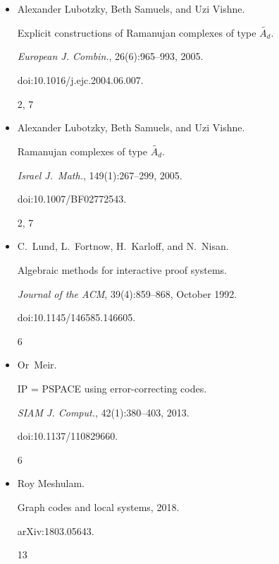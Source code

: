 \documentclass[10pt,a4paper]{article}
\begin{document}
\begin{itemize}
doi:10.1109/FOCS.2018.00062.


7




\item[] 
[24]

Alexander Lubotzky, Beth Samuels, and Uzi Vishne.


Explicit constructions of Ramanujan complexes of type
$\tilde{A_{d}}$.


\emph{European J. Combin.}, 26(6):965–993, 2005.


doi:10.1016/j.ejc.2004.06.007.


2, 7




\item[] 
[25]

Alexander Lubotzky, Beth Samuels, and Uzi Vishne.


Ramanujan complexes of type $\tilde{A_{d}}$.


\emph{Israel J. Math.}, 149(1):267–299, 2005.


doi:10.1007/BF02772543.


2, 7




\item[] 
[26]

C. Lund, L. Fortnow, H. Karloff, and N. Nisan.


Algebraic methods for interactive proof systems.


\emph{Journal of the ACM}, 39(4):859–868, October 1992.


doi:10.1145/146585.146605.


6




\item[] 
[27]

Or Meir.


IP = PSPACE using error-correcting codes.


\emph{SIAM J. Comput.}, 42(1):380–403, 2013.


doi:10.1137/110829660.


6




\item[] 
[28]

Roy Meshulam.


Graph codes and local systems, 2018.


arXiv:1803.05643.


13





\end{itemize}
\end{document}
